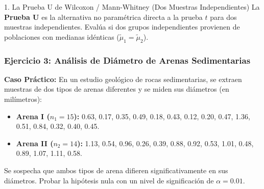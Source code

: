 \documentclass[11pt,a4paper]{article}
\begin{document}
\begin{subsection}{1. La Prueba U de Wilcoxon / Mann-Whitney (Dos Muestras Independientes)}
    La \textbf{Prueba U} es la alternativa no paramétrica directa a la prueba $t$ para dos muestras independientes. Evalúa si dos grupos independientes provienen de poblaciones con medianas idénticas ($\tilde{\mu}_1 = \tilde{\mu}_2$).

    \subsubsection*{Ejercicio 3: Análisis de Diámetro de Arenas Sedimentarias}
    \textbf{Caso Práctico:} En un estudio geológico de rocas sedimentarias, se extraen muestras de dos tipos de arenas diferentes y se miden sus diámetros (en milímetros):
    \begin{itemize}
        \item \textbf{Arena I ($n_1 = 15$):} 0.63, 0.17, 0.35, 0.49, 0.18, 0.43, 0.12, 0.20, 0.47, 1.36, 0.51, 0.84, 0.32, 0.40, 0.45.
        \item \textbf{Arena II ($n_2 = 14$):} 1.13, 0.54, 0.96, 0.26, 0.39, 0.88, 0.92, 0.53, 1.01, 0.48, 0.89, 1.07, 1.11, 0.58.
    \end{itemize}
    Se sospecha que ambos tipos de arena difieren significativamente en sus diámetros. Probar la hipótesis nula con un nivel de significación de $\alpha = 0.01$.


\end{subsection}
\end{document}
